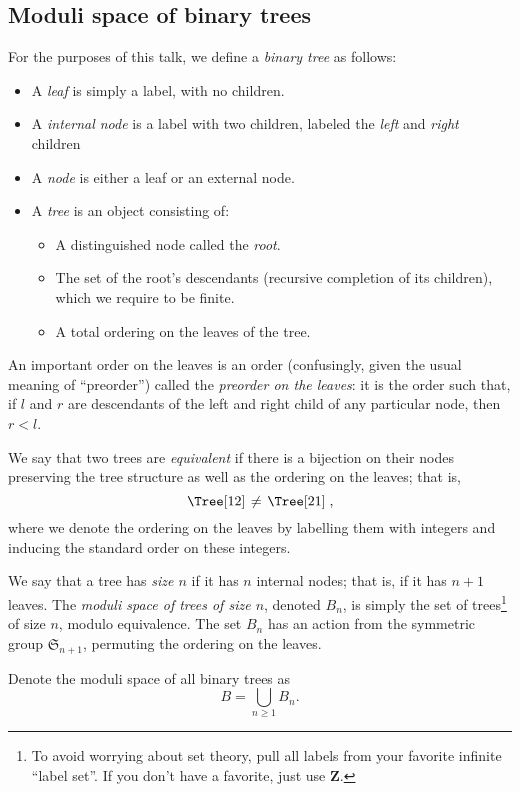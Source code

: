 \documentclass{article}
\newcommand{\ZZ}{\mathbold{Z}}
\newcommand{\Sym}{\mathfrak{S}}
\begin{document}
\subsection{Moduli space of binary trees}
For the purposes of this talk, we define a \textit{binary tree} as follows:
\begin{itemize}
\item A \textit{leaf} is simply a label, with no children.
\item A \textit{internal node} is a label with two children, labeled the \textit{left} and \textit{right} children
\item A \textit{node} is either a leaf or an external node.
\item A \textit{tree} is an object consisting of:
  \begin{itemize}
  \item A distinguished node called the \textit{root}.
  \item The set of the root's descendants (recursive completion of its children), which we require to be finite.
  \item A total ordering on the leaves of the tree.
  \end{itemize}

\end{itemize}
An important order on the leaves is an order (confusingly, given the usual meaning of ``preorder'') called the \textit{preorder on the leaves}: it is the order such that, if $l$ and $r$ are descendants of the left and right child of any particular node, then $r<l$.

We say that two trees are \textit{equivalent} if there is a bijection on their nodes preserving the tree structure as well as the ordering on the leaves; that is,
\[\left.\Tree[ 1 2 ] \right. \ne \left.\Tree[ 2 1 ] \right. , \]
where we denote the ordering on the leaves by labelling them with integers and inducing the standard order on these integers.

We say that a tree has \textit{size $n$} if it has $n$ internal nodes; that is, if it has $n+1$ leaves.  The \textit{moduli space of trees of size $n$}, denoted $B_n$, is simply the set of trees\footnote{To avoid worrying about set theory, pull all labels from your favorite infinite ``label set''.  If you don't have a favorite, just use $\ZZ$.} of size $n$, modulo equivalence.  The set $B_n$ has an action from the symmetric group $\Sym_{n+1}$, permuting the ordering on the leaves.

Denote the moduli space of all binary trees as
\[B=\bigcup_{n \ge 1}B_n. \]
\end{document}
